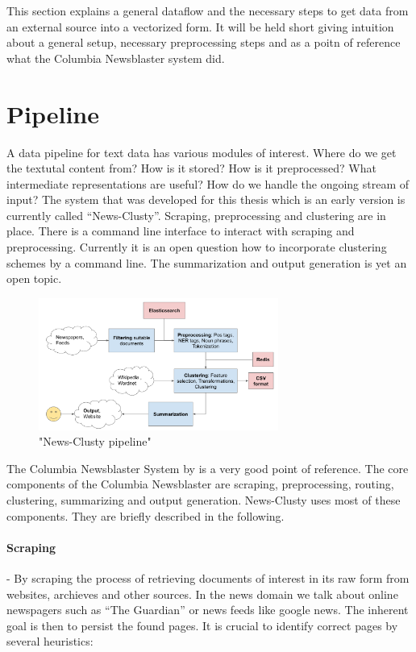 
This section explains a general dataflow and the necessary steps to get data from an external source into a vectorized form. It will be held short giving intuition about a general setup, necessary preprocessing steps and as a poitn of reference what the Columbia Newsblaster system did.

\section{Pipeline}
  A data pipeline for text data has various modules of interest. Where do we get the textutal content from? How is it stored? How is it preprocessed? What intermediate representations are useful? How do we handle the ongoing stream of input? The system that was developed for this thesis which is an early version is currently called ``News-Clusty''. Scraping, preprocessing and clustering are in place. There is a command line interface to interact with scraping and preprocessing. Currently it is an open question how to incorporate clustering schemes by a command line. The summarization and output generation is yet an open topic.

  \begin{figure}[h!]
    \centering
      \includegraphics[width=0.7\textwidth]{news_clusty.png}
      \caption{"News-Clusty pipeline"}
      \label{news_clusty}
  \end{figure}

  The Columbia Newsblaster System by \cite{ColumbiaMultiDoc2001} is a very good point of reference. The core components of the Columbia Newsblaster are scraping, preprocessing, routing, clustering, summarizing and output generation. News-Clusty uses most of these components. They are briefly described in the following.

  \paragraph{Scraping} - By scraping the process of retrieving documents of interest in its raw form from websites, archieves and other sources. In the news domain we talk about online newspagers such as ``The Guardian'' or news feeds like google news. The inherent goal is then to persist the found pages. It is crucial to identify correct pages by several heuristics:

